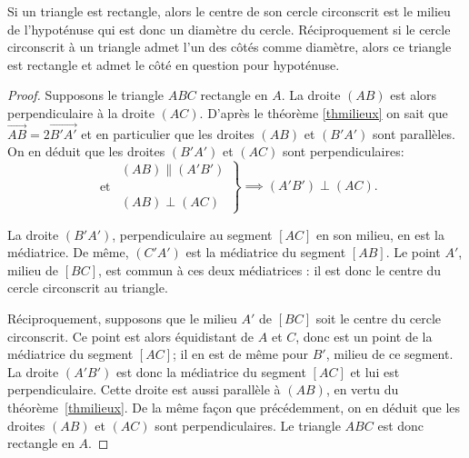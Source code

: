 \begin{figure}[ht]
\centering
{}
\figcaption{}\label{figtrec}
\end{figure}


\begin{thm}
Si un triangle est rectangle, alors le centre de son cercle circonscrit est le milieu de l'hypoténuse qui est donc un diamètre du cercle. Réciproquement si le cercle circonscrit à un triangle admet l'un des côtés comme diamètre, alors ce triangle est rectangle et admet le côté en question pour hypoténuse.
\label{diamtrrec}
\end{thm}

\begin{proof}
Supposons le triangle $ABC$ rectangle en $A$. La droite $(AB)$ est alors perpendiculaire à la droite $(AC)$.
D'après le théorème \ref{thmilieux} on sait que $\overrightarrow{AB}=2\overrightarrow{B'A'}$ et en particulier que les droites $(AB)$ et $(B'A')$ sont parallèles. On en déduit que les droites $(B'A')$ et $(AC)$ sont perpendiculaires:
\[\left.\begin{aligned} &(AB)\parallel(A'B')\\
\text{et}&\\
&(AB)\perp(AC)\end{aligned}\right\}\implies (A'B')\perp(AC).
\]

La droite $(B'A')$, perpendiculaire au segment $[AC]$ en son milieu, en est la médiatrice. De même, $(C'A')$ est la médiatrice du segment $[AB]$. Le point $A'$, milieu de $[BC]$, est commun à ces deux médiatrices : il est donc le centre du cercle circonscrit au triangle.



Réciproquement, supposons que le milieu $A'$ de $[BC]$ soit le centre du cercle circonscrit. Ce point est alors équidistant de $A$ et $C$, donc est un point de la médiatrice du segment $[AC]$; il en est de même pour $B'$, milieu de ce segment. La droite $(A'B')$ est donc la médiatrice du segment $[AC]$ et lui est  perpendiculaire. Cette droite est aussi parallèle à $(AB)$, en vertu du théorème \ref{thmilieux}. De la même façon que précédemment, on en déduit que les droites $(AB)$ et $(AC)$ sont perpendiculaires. Le triangle $ABC$ est donc rectangle en $A$.
\end{proof}

